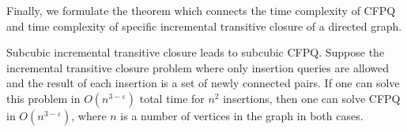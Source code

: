 Finally, we formulate the theorem which connects the time complexity of CFPQ and time complexity of specific incremental transitive closure of a directed graph.
\begin{theorem}{Subcubic incremental transitive closure leads to subcubic CFPQ.}
Suppose the incremental transitive closure problem where only insertion queries are allowed and the result of each insertion is a set of newly connected pairs. If one can solve this problem in $O(n^{3-\varepsilon})$ total time for $n^2$ insertions, then one can solve CFPQ in $O(n^{3-\varepsilon})$, where $n$ is a number of vertices in the graph in both cases. 
\end{theorem}